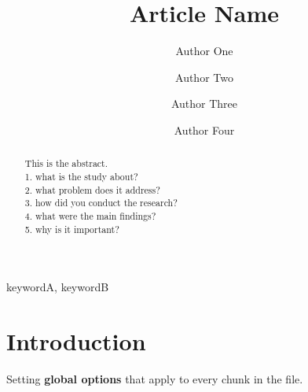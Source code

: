 \documentclass[review]{elsarticle} %
\newenvironment{Shaded}{\begin{snugshade}}{\end{snugshade}}
\newcommand{\FunctionTok}[1]{\textcolor[rgb]{0.00,0.00,0.00}{#1}}
\newcommand{\NormalTok}[1]{#1}
\begin{document}
\begin{frontmatter}

  \title{Article Name}
    \author[a,1]{Author One}
    \author[a,b]{Author Two}
    \author[c]{Author Three}
    \author[a]{Author Four}
      \address[a]{Graduate School of Engineering, Nagasaki University, 1-14 Bunkyo-machi,
Nagasaki 852-8521, Japan}
    \address[b]{Department, University, Street, City, State, Zip}
    \address[c]{Department, University, Street, City, State, Zip}
  
  \begin{abstract}
  This is the abstract.\\
  1. what is the study about?\\
  2. what problem does it address?\\
  3. how did you conduct the research?\\
  4. what were the main findings?\\
  5. why is it important?
  \end{abstract}
   \begin{keyword} keywordA, keywordB\end{keyword}
 \end{frontmatter}

\newpage

\section{Introduction}\label{intro}

Setting \textbf{global options} that apply to every chunk in the file.

\begin{Shaded}
\end{Shaded}
\end{document}
